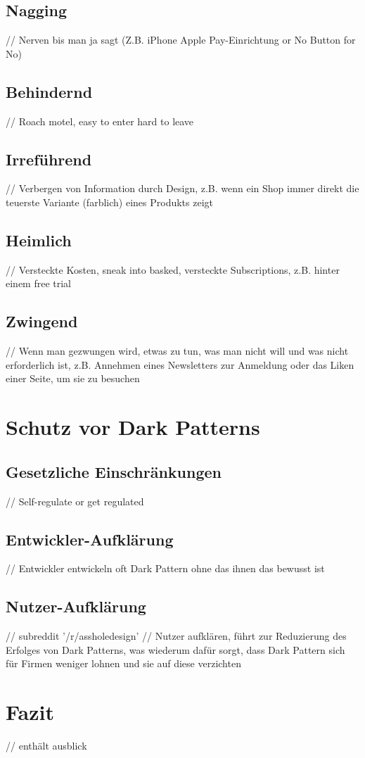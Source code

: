 \documentclass[conference,compsoc,final,a4paper]{IEEEtran}
\begin{document}
\subsection{Nagging}
// Nerven bis man ja sagt (Z.B. iPhone Apple Pay-Einrichtung or No Button for No)
\subsection{Behindernd}
// Roach motel, easy to enter hard to leave
\subsection{Irreführend}
// Verbergen von Information durch Design, z.B. wenn ein Shop immer direkt die teuerste Variante (farblich) eines Produkts zeigt
\subsection{Heimlich}
// Versteckte Kosten, sneak into basked, versteckte Subscriptions, z.B. hinter einem free trial
\subsection{Zwingend}
// Wenn man gezwungen wird, etwas zu tun, was man nicht will und was nicht erforderlich ist, z.B. Annehmen eines Newsletters zur Anmeldung oder das Liken einer Seite, um sie zu besuchen


\section{Schutz vor Dark Patterns}
\subsection{Gesetzliche Einschränkungen}
// Self-regulate or get regulated
\subsection{Entwickler-Aufklärung}
// Entwickler entwickeln oft Dark Pattern ohne das ihnen das bewusst ist
\subsection{Nutzer-Aufklärung}
// subreddit '/r/assholedesign' \autocite*{Chivukula_2019}
// Nutzer aufklären, führt zur Reduzierung des Erfolges von Dark Patterns, was wiederum dafür sorgt, dass Dark Pattern sich für Firmen weniger lohnen und sie auf diese verzichten

\section{Fazit}
// enthält ausblick

\nocite{*}
\printbibliography
\end{document}
